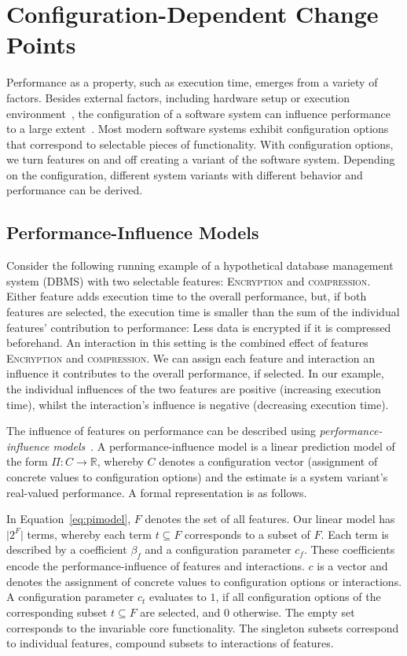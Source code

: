 \documentclass[sigconf]{acmart}
\begin{document}
	\section{Configuration-Dependent Change Points}
	Performance as a property, such as execution time, emerges from a variety of factors.
	Besides external factors, including hardware setup or execution environment~\cite{ousterhout_always_2018}, the configuration  of a software system can influence performance to a large extent~\cite{siegmundPredictingPerformanceAutomated2012}.
	Most modern software systems exhibit configuration options that correspond to selectable pieces of functionality.
	With configuration options, we turn features on and off creating a variant of the software system.
	Depending on the configuration, different system variants with different behavior and performance can be derived.

	\subsection{Performance-Influence Models}\label{sec:pimodels}
	Consider the following running example of a hypothetical database management system (DBMS) with two selectable features: \textsc{Encryption} and \textsc{compression}.
	Either feature adds execution time to the overall performance, but, if both features are selected, the execution time is smaller than the sum of the individual features' contribution to performance: Less data is encrypted if it is compressed beforehand.
	An interaction in this setting is the combined effect of features \textsc{Encryption} and \textsc{compression}.
	We can assign each feature and interaction an influence it contributes to the overall performance, if selected. In our example, the individual influences of the two features are positive (increasing execution time), whilst the interaction's influence is negative (decreasing execution time).

	The influence of features on performance can be described using \emph{performance-influence models}~\cite{siegmundPerformanceinfluenceModelsHighly2015}.
	A performance-influence model is a linear prediction model of the form $\Pi:C\rightarrow \mathbb{R}$, whereby $C$ denotes a configuration vector (assignment of concrete values to configuration options) and the estimate is a system variant's real-valued performance.
	A formal representation is as follows.

	In Equation~\ref{eq:pimodel}, $F$ denotes the set of all features. Our linear model has $\vert 2^F\vert$ terms, whereby each term $t \subseteq F$ corresponds to a subset of $F$. Each term is described by a coefficient $\beta_f$ and a configuration parameter $c_f$.
	These coefficients encode the performance-influence of features and interactions. $c$ is a vector and denotes the assignment of concrete values to configuration options or interactions. A configuration parameter $c_t$ evaluates to $1$, if all configuration options of the corresponding subset $t \subseteq F$ are selected, and $0$ otherwise. The empty set corresponds to the invariable core functionality. The singleton subsets correspond to individual features, compound subsets to interactions of features.
\end{document}
